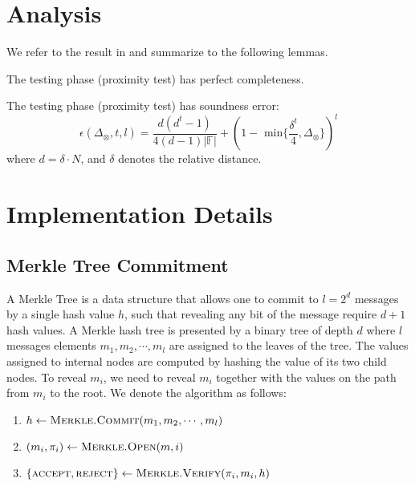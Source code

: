 \section{Analysis}

We refer to the result in \cite{cryptoeprint:2020/1426} and summarize to the following lemmas. 

\begin{lemma}
\label{lemma:pc-completeness}
The testing phase (proximity test) has perfect completeness.
\end{lemma}

\begin{lemma}
\label{lemma:pc-soundness}
The testing phase (proximity test) has soundness error:
$$
    \epsilon(\Delta_\otimes, t, l) = \frac{d(d^t-1)}{4(d-1)|\mathbb{F}|} + (1 - \text{ min}\{\frac{\delta^t}{4}, \Delta_\otimes \})^l
$$
where $d = \delta \cdot N$, and $\delta$ denotes the relative distance.
\end{lemma}



\section{Implementation Details}

\subsection{Merkle Tree Commitment}


A Merkle Tree is a data structure that allows one to commit to $l = 2^{d}$ messages by a single hash value $h$, such that revealing any bit of the message require $d+1$ hash values. A Merkle hash tree is presented by a binary tree of depth $d$ where $l$ messages elements $m_1, m_2, \cdots, m_l$ are assigned to the leaves of the tree. The values assigned to internal nodes are computed by hashing the value of its two child nodes. To reveal $m_i$, we need to reveal $m_i$ together with the values on the path from $m_i$ to the root. We denote the algorithm as follows:

\begin{enumerate}
    \item $h \leftarrow \textsc{Merkle.Commit}(m_1, m_2, \cdots, m_l)$
    \item $(m_i, \pi_i) \leftarrow \textsc{Merkle.Open}(m, i)$
    \item $\{\textsc{accept}, \textsc{reject}\} \leftarrow \textsc{Merkle.Verify}(\pi_i, m_i, h)$
\end{enumerate}

